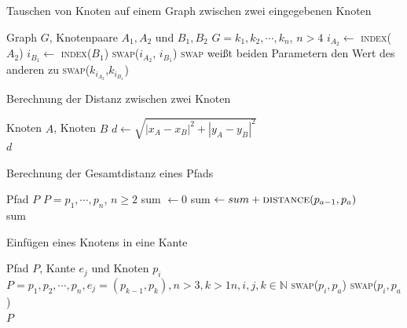 \begin{algorithm}
    \caption{Tauschen von Knoten auf einem Graph zwischen zwei eingegebenen Knoten}
    \label{alg:swap-nodes-inbetween}
    \begin{algorithmic}[1]
        \Require Graph $G$, Knotenpaare $A_1,A_2$ und $B_1,B_2$
        \Require $G=k_1,k_2,\cdots,k_n$, $n>4$
        \State $i_{A_2} \gets$ \textsc{index}($A_2$)
        \State $i_{B_1} \gets$ \textsc{index}($B_1$)
            \State \textsc{swap}($i_{A_2}$, $i_{B_1}$) 
            \Comment \textsc{swap} weißt beiden Parametern den Wert des anderen zu
        \EndIf
            \State \textsc{swap}($k_{i_{A_2}}$,$k_{i_{B_1}}$)
        \EndWhile
    \end{algorithmic}
\end{algorithm}

\begin{algorithm}
    \caption{Berechnung der Distanz zwischen zwei Knoten}
    \label{alg:calc-distance-two-nodes}
    \begin{algorithmic}[1]
        \Require Knoten $A$, Knoten $B$
        \State $d \gets \sqrt{|x_A - x_B|^2 + |y_A - y_B|^2}$\\
        \Return $d$
    \end{algorithmic}
\end{algorithm}

\begin{algorithm}
    \caption{Berechnung der Gesamtdistanz eines Pfads}
    \label{alg:calc-total-distance}
    \begin{algorithmic}[1]
        \Require Pfad $P$
        \Require $P=p_1,\cdots,p_n$, $n \geq 2$
        \State sum $\gets 0$
            \State sum $\gets sum + \textrm{\textsc{distance}}(p_{a-1}, p_a)$
        \EndFor\\
        \Return sum
    \end{algorithmic}
\end{algorithm}


\begin{algorithm}
    \caption{Einfügen eines Knotens in eine Kante}
    \label{alg:after-control-merge}
    \begin{algorithmic}[1]
        \Require Pfad $P$, Kante $e_j$ und Knoten $p_i$
        \Require $P=p_1,p_2,\cdots,p_n,e_j=(p_{k-1},p_k),n>3,k>1n,i,j,k\in \mathbb{N}$
                \State \textsc{swap}($p_i,p_a$)
            \EndFor
        \Else
                \State \textsc{swap}($p_i,p_a$)
            \EndFor
        \EndIf\\
        \Return $P$
    \end{algorithmic}
\end{algorithm}
